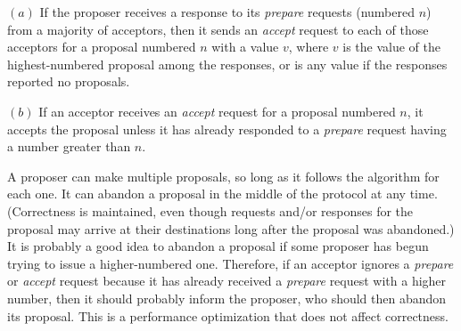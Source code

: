 \begin{phase}
    $(a)$ If the proposer receives a response to its \emph{prepare} requests (numbered $n$) from a majority of acceptors, then it sends an \emph{accept} request to each of those acceptors for a proposal numbered $n$ with a value $v$, where $v$ is the value of the highest-numbered proposal among the responses, or is any value if the responses reported no proposals.

    $(b)$ If an acceptor receives an \emph{accept} request for a proposal numbered $n$, it accepts the proposal unless it has already responded to a \emph{prepare} request having a number greater than $n$.
\end{phase}

A proposer can make multiple proposals, so long as it follows the algorithm for each one. 
It can abandon a proposal in the middle of the protocol at any time.
(Correctness is maintained, even though requests and/or responses for the proposal may arrive at their destinations long after the proposal was abandoned.)
It is probably a good idea to abandon a proposal if some proposer has begun trying to issue a higher-numbered one.
Therefore, if an acceptor ignores a \emph{prepare} or \emph{accept} request because it has already received a \emph{prepare} request with a higher number, then it should probably inform the proposer, who should then abandon its proposal.
This is a performance optimization that does not affect correctness.
